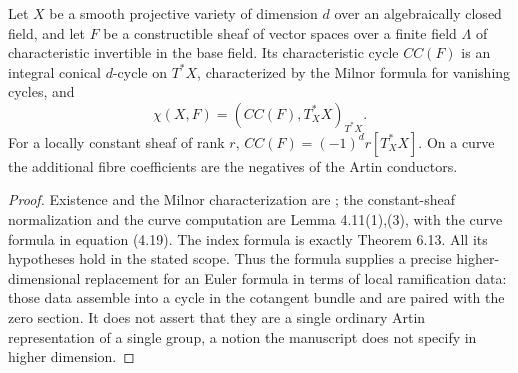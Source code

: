\begin{theorem}\label{thm:B3-index}
Let $X$ be a smooth projective variety of dimension $d$ over an
algebraically closed field, and let $F$ be a constructible sheaf of
vector spaces over a finite field $\Lambda$ of characteristic
invertible in the base field. Its characteristic cycle $CC(F)$ is an
integral conical $d$-cycle on $T^*X$, characterized by the Milnor
formula for vanishing cycles, and
\[
 \chi(X,F)=(CC(F),T_X^*X)_{T^*X}.
\]
For a locally constant sheaf of rank $r$,
$CC(F)=(-1)^d r[T_X^*X]$. On a curve the additional fibre
coefficients are the negatives of the Artin conductors.
\end{theorem}
\begin{proof}
Existence and the Milnor characterization are
\cite[Theorem 4.9]{BSaito}; the constant-sheaf normalization and the
curve computation are Lemma 4.11(1),(3), with the curve formula
in equation (4.19). The index formula is exactly
Theorem 6.13. All its hypotheses hold in the stated scope. Thus the
formula supplies a precise higher-dimensional replacement for an
Euler formula in terms of local ramification data: those data assemble
into a cycle in the cotangent bundle and are paired with the zero
section. It does not assert that they are a single ordinary Artin
representation of a single group, a notion the manuscript does not
specify in higher dimension.
\end{proof}

